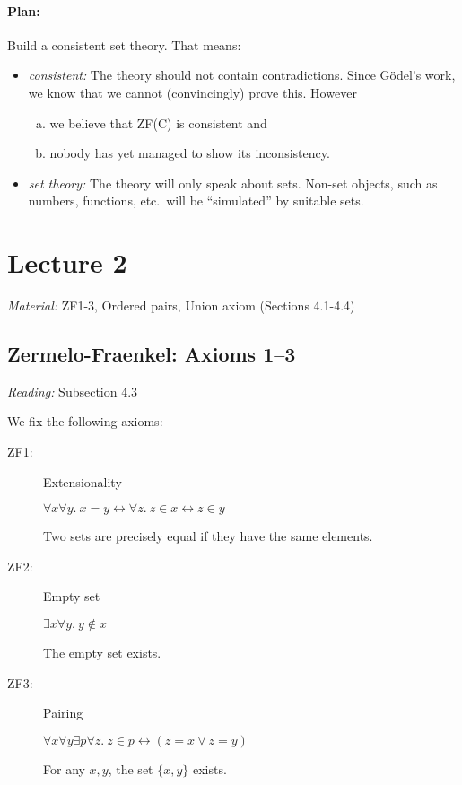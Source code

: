 \documentclass{whrartcl}
\begin{document}
\paragraph{Plan:} Build a consistent set theory. That means:
\begin{itemize}
\item \emph{consistent:} The theory should not contain contradictions. Since
  Gödel's work, we know that we cannot (convincingly) prove this. However
  \begin{enumerate}[(a)]
  \item we believe that ZF(C) is consistent and
  \item nobody has yet managed to show its inconsistency.
  \end{enumerate}
\item \emph{set theory:} The theory will only speak about sets. Non-set objects,
  such as numbers, functions, etc.\ will be ``simulated'' by suitable sets.
\end{itemize}


\newpage
\section{Lecture 2}

\emph{Material:} ZF1-3, Ordered pairs, Union axiom (Sections 4.1-4.4)


\subsection{Zermelo-Fraenkel: Axioms 1--3}
\emph{Reading:} Subsection 4.3

\begin{definition}
  We fix the following axioms:
  \begin{description}
  \item[ZF1:] Extensionality

    $\forall x \forall y.~x = y \leftrightarrow \forall z.~z \in x
    \leftrightarrow z \in y$

    Two sets are precisely equal if they have the same elements.

  \item[ZF2:] Empty set

    $\exists x \forall y.~ y \not\in x$

    The empty set exists.

  \item[ZF3:] Pairing

    $\forall x \forall y \exists p \forall z.~z \in p \leftrightarrow (z = x
    \vee z = y)$

    For any $x,y$, the set $\{x, y\}$ exists.
  \end{description}
\end{definition}
\end{document}
